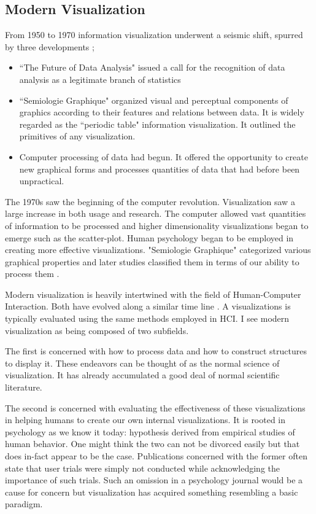 \documentclass[a4paper, 10pt, titlepage, twocolumn, onehalfspace]{article}
\begin{document}
\subsection{Modern Visualization}

From 1950 to 1970 information visualization underwent a seismic shift, spurred by three developments \cite{friendly2001milestones};
\begin{itemize}
\item ``The Future of Data Analysis" issued a call for the recognition of data analysis as a legitimate branch of statistics \cite{tukey1962future}
\item ``Semiologie Graphique" \cite{bertin1973semiologie} organized visual and perceptual components of graphics according to their features and relations between data. It is widely regarded as the ``periodic table" information visualization. It outlined the primitives of any visualization.
\item Computer processing of data had begun. It offered the opportunity to create new graphical forms and processes quantities of data that had before been unpractical.
\end{itemize}

The 1970s saw the beginning of the computer revolution. Visualization saw a large increase in both usage and research. The computer allowed vast quantities of information to be processed and higher dimensionality visualizations began to emerge such as the scatter-plot. Human psychology began to be employed in creating more effective visualizations. "Semiologie Graphique" categorized various graphical properties and later studies classified them in terms of our ability to process them \cite{cleveland1984graphical}.

Modern visualization is heavily intertwined with the field of Human-Computer Interaction. Both have evolved along a similar time line \cite{myers1998brief}. A visualizations is typically evaluated using the same methods employed in HCI. I see modern visualization as being composed of two subfields. 

The first is concerned with how to process data and how to construct structures to display it. These endeavors can be thought of as the normal science of visualization. It has already accumulated a good deal of normal scientific literature.

The second is concerned with evaluating the effectiveness of these visualizations in helping humans to create our own internal visualizations. It is rooted in psychology as we know it today: hypothesis derived from empirical studies of human behavior. One might think the two can not be divorced easily but that does in-fact appear to be the case. Publications concerned with the former often state that user trials were simply not conducted while acknowledging the importance of such trials. Such an omission in a psychology journal would be a cause for concern but visualization has acquired something resembling a basic paradigm.
\end{document}
